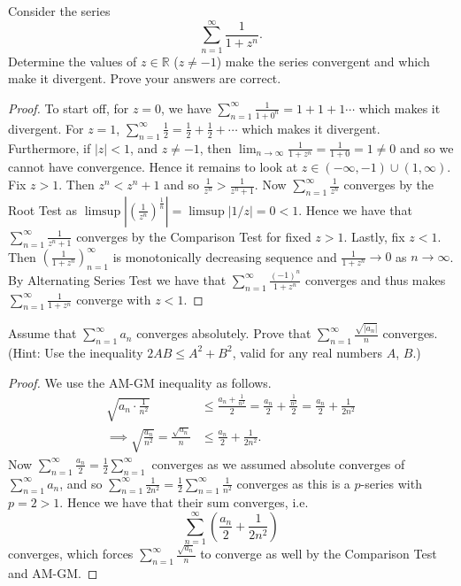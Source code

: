 \documentclass[oneside]{amsart}
\theoremstyle{definition}
\newcommand{\rr}{\mathbb R}
\begin{document}
\begin{tcolorbox}[colback=black!5!white,colframe=black!75!black,title= Exercise $2.2.$] Consider the series 
\[
\sum_{n=1}^\infty \frac{1}{1+z^n}.
\] Determine the values of $z \in \rr$ ($z \neq -1$) make the series convergent and which make it divergent. Prove your answers are correct.
\tcblower 
\begin{proof} To start off, for $z = 0$, we have $\sum_{n=1}^\infty \frac {1}{1+0^n} = 1+1+1 \cdots $ which makes it divergent. For $z =1$, $\sum_{n=1}^\infty \frac {1}{2} = \frac{1}{2} + \frac{1}{2} + \cdots $ which makes it divergent. Furthermore, if $|z|<1$, and $z\neq -1$, then $ \lim_{n \to \infty} \frac{1}{1+z^n} = \frac{1}{1+0} = 1 \neq 0$ and so we cannot have convergence. Hence it remains to look at $z \in (-\infty, -1) \cup (1, \infty)$. Fix $z>1$. Then $z^n<z^n+1$ and so $\frac{1}{z^n} > \frac{1}{z^n+1}$. Now $\sum_{n=1}^\infty \frac{1}{z^n}$ converges by the Root Test as $\limsup \left | \left (\frac{1}{z^n} \right ) ^\frac{1}{n}\right| =\limsup | 1/z| =0<1$. Hence we have that $\sum_{n=1}^\infty \frac{1}{z^n+1}$ converges by the Comparison Test for fixed $z>1$. Lastly, fix $z<1$. Then $(\frac{1}{1+z^n})_{n = 1}^\infty$ is monotonically decreasing sequence and $\frac{1}{1+z^n} \to 0$ as $n \to \infty$. By Alternating Series Test we have that $\sum_{n=1}^\infty \frac{(-1)^n}{1+z^n}$ converges and thus makes $\sum_{n=1}^\infty \frac{1}{1+z^n}$ converge with $z<1$.
\end{proof}
\end{tcolorbox}


\begin{tcolorbox}[colback=black!5!white,colframe=black!75!black,title= Exercise $3.1.$] Assume that $ \sum_{n=1}^\infty a_n$ converges absolutely. Prove that $ \sum_{n=1}^\infty \frac{\sqrt{|a_n|}}{n}$ converges. (Hint: Use the inequality $ 2 AB \leq A^2 +B^2$, valid for any real numbers $A$, $B$.)
\tcblower 
\begin{proof} We use the AM-GM inequality as follows. 
\begin{align*}
	\sqrt{a_n \cdot \frac{1}{n^2}} & \leq \frac{a_n + \frac{1}{n^2}} {2} = \frac{a_n}{2} + \frac{\frac{1}{n^2}}{2} = \frac{a_n}{2}+\frac{1}{2n^2} \\
	\implies \sqrt{ \frac{a_n}{n^2}} = \frac{\sqrt{a_n}}{n} & \leq \frac{a_n}{2}+\frac{1}{2n^2}.
\end{align*}
Now $\sum_{n=1}^\infty  \frac{a_n}{2} = \frac{1}{2} \sum_{n=1}^\infty $ converges as we assumed absolute converges of $\sum_{n=1}^\infty a_n$, and so $\sum_{n=1}^\infty \frac{1}{2n^2} =\frac{1}{2} \sum_{n=1}^\infty \frac{1}{n^2}$ converges as this is a $p$-series with $p =2>1$. Hence we have that their sum converges, i.e. $$ \sum_{n=1}^\infty \left (\frac{a_n}{2}+\frac{1}{2n^2} \right )$$ converges, which forces $\sum _{n=1}^\infty \frac{\sqrt{a_n}}{n}$ to converge as well by the Comparison Test and AM-GM. 
\end{proof}

\end{tcolorbox}
\end{document}
